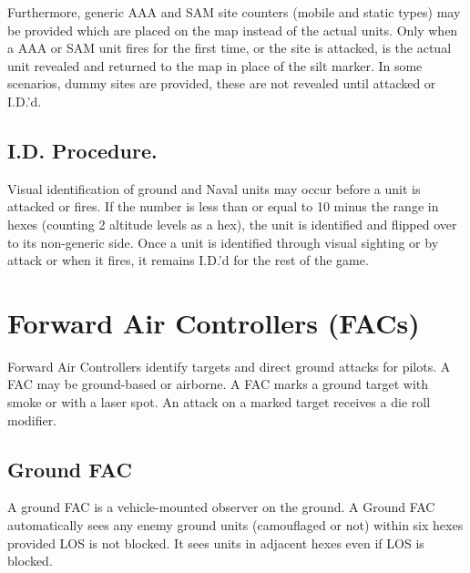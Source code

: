\begin{advancedrules}
    Furthermore, generic AAA and SAM site counters (mobile and static types) may be provided which are placed on the map instead of the actual units. Only when a AAA or SAM unit fires for the first time, or the site is attacked, is the actual unit revealed and returned to the map in place of the silt marker. In some scenarios, dummy sites are provided, these are not revealed until attacked or I.D.'d.

    \subsection{I.D. Procedure.} 
    Visual identification of ground and Naval units may occur before a unit is attacked or fires. 
    If the number is less than or equal to 10 minus the range in hexes (counting 2 altitude levels as a hex), the unit is identified and flipped over to its non-generic side. 
    Once a unit is identified through visual sighting or by attack or when it fires, it remains I.D.'d for the rest of the game.

    \section{Forward Air Controllers (FACs)}
    \label{rule:sighting-facs}

    Forward Air Controllers identify targets and direct ground attacks for pilots. A FAC may be ground-based or airborne. A FAC marks a ground target with smoke or with a laser spot. An attack on a marked target receives a  die roll modifier.

    \subsection{Ground FAC} A ground FAC is a vehicle-mounted observer on the ground. A Ground FAC automatically sees any enemy ground units (camouflaged or not) within six hexes provided LOS is not blocked. It sees units in adjacent hexes even if LOS is blocked.


\end{advancedrules}
